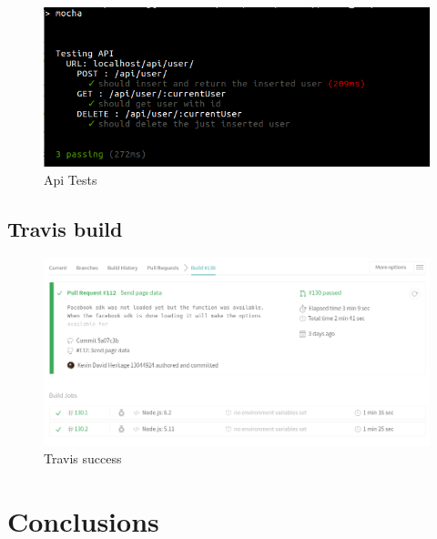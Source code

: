 \documentclass{article}
\begin{document}
	
	\begin{figure}[H]
	\includegraphics[width=15cm]{images/tests.png}
	\caption{Api Tests}
	\end{figure}
	

	
	
	\pagebreak
	
	\subsection{Travis build}
	\begin{figure}[H]
	\includegraphics[width=15cm]{images/Travis.png}
	\caption{Travis success }
	\end{figure}	
	
	\pagebreak
	
		


\pagebreak
\section{Conclusions}
\end{document}
